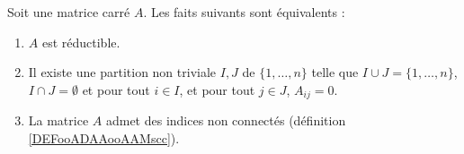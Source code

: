 \begin{proposition}      \label{PROPooZTYDooZAxQxF}
    Soit une matrice carré \( A\). Les faits suivants sont équivalents :
    \begin{enumerate}
        \item       \label{ITEMooYULAooVqgOnt}
            \( A\) est réductible.
        \item       \label{ITEMooNLVXooYSQKwO}
            Il existe une partition non triviale \( I,J\) de \( \{ 1,\ldots, n \}\) telle que \( I\cup J=\{ 1,\ldots, n \}\), \( I\cap J=\emptyset\) et pour tout \( i\in I\), et pour tout \( j\in J\), \( A_{ij}=0\).
        \item       \label{ITEMooVNOHooRUNpwG}
            La matrice \( A\) admet des indices non connectés (définition \ref{DEFooADAAooAAMscc}).
    \end{enumerate}
\end{proposition}

